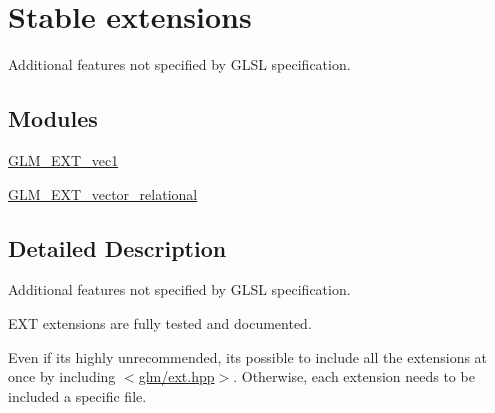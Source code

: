\hypertarget{group__ext}{}\section{Stable extensions}
\label{group__ext}


Additional features not specified by G\+L\+SL specification.  


\subsection*{Modules}
\begin{DoxyCompactItemize}
\item 
\hyperlink{group__ext__vec1}{G\+L\+M\+\_\+\+E\+X\+T\+\_\+vec1}
\item 
\hyperlink{group__ext__vector__relational}{G\+L\+M\+\_\+\+E\+X\+T\+\_\+vector\+\_\+relational}
\end{DoxyCompactItemize}


\subsection{Detailed Description}
Additional features not specified by G\+L\+SL specification. 

E\+XT extensions are fully tested and documented.

Even if it\textquotesingle{}s highly unrecommended, it\textquotesingle{}s possible to include all the extensions at once by including $<$\hyperlink{ext_8hpp}{glm/ext.\+hpp}$>$. Otherwise, each extension needs to be included a specific file. 